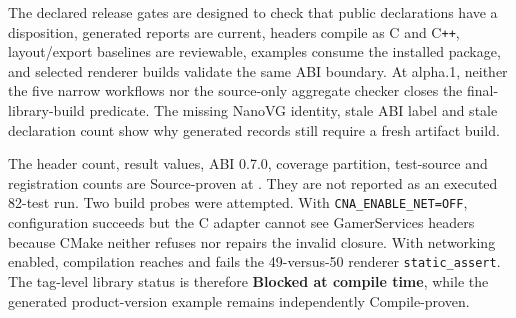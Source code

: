 The declared release gates are designed to check that public declarations have a disposition,
generated reports are current, headers compile as C and C\texttt{++}, layout/export baselines are
reviewable, examples consume the installed package, and selected renderer builds validate the
same ABI boundary. At alpha.1, neither the five narrow workflows nor the source-only aggregate
checker closes the final-library-build predicate. The missing NanoVG identity, stale ABI label and
stale declaration count show why generated records still require a fresh artifact build.

\begin{evidencenote}
The header count, result values, ABI 0.7.0, coverage partition, test-source and registration counts
are Source-proven at \CnaEditionTag{}. They are not reported as an executed 82-test run. Two
build probes were attempted. With \texttt{CNA\_ENABLE\_NET=OFF}, configuration succeeds but the C
adapter cannot see GamerServices headers because CMake neither refuses nor repairs the invalid
closure. With networking enabled, compilation reaches and fails the 49-versus-50 renderer
\texttt{static\_assert}. The tag-level library status is therefore \textbf{Blocked at compile
time}, while the generated product-version example remains independently Compile-proven.
\end{evidencenote}
